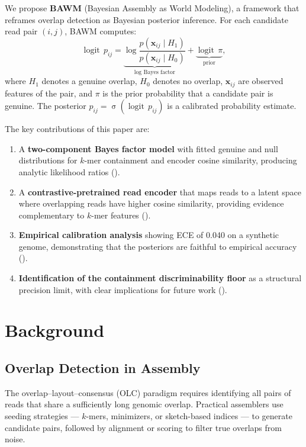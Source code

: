 \documentclass[11pt,a4paper]{article}
\newcommand{\bx}{\mathbf{x}}
\DeclareMathOperator{\logit}{logit}
\DeclareMathOperator{\sigmoid}{\sigma}
\begin{document}
We propose \textbf{BAWM} (Bayesian Assembly as World Modeling), a
framework that reframes overlap detection as Bayesian posterior
inference.  For each candidate read pair $(i,j)$, BAWM computes:
\begin{equation}
  \label{eq:posterior}
  \logit\, p_{ij}
    = \underbrace{\log \frac{p(\bx_{ij} \mid H_1)}{p(\bx_{ij} \mid H_0)}}_{\text{log Bayes factor}}
    + \underbrace{\logit\, \pi}_{\text{prior}},
\end{equation}
where $H_1$ denotes a genuine overlap, $H_0$ denotes no overlap,
$\bx_{ij}$ are observed features of the pair, and $\pi$ is the prior
probability that a candidate pair is genuine.  The posterior
$p_{ij} = \sigmoid(\logit\, p_{ij})$ is a calibrated probability
estimate.

The key contributions of this paper are:
\begin{enumerate}
  \item A \textbf{two-component Bayes factor model} with fitted
    genuine and null distributions for $k$-mer containment and encoder
    cosine similarity, producing analytic likelihood ratios
    ().
  \item A \textbf{contrastive-pretrained read encoder} that maps reads
    to a latent space where overlapping reads have higher cosine
    similarity, providing evidence complementary to $k$-mer features
    ().
  \item \textbf{Empirical calibration analysis} showing ECE of 0.040
    on a synthetic genome, demonstrating that the posteriors are
    faithful to empirical accuracy ().
  \item \textbf{Identification of the containment discriminability
    floor} as a structural precision limit, with clear implications for
    future work ().
\end{enumerate}


\section{Background}
\label{sec:background}

\subsection{Overlap Detection in Assembly}

The overlap--layout--consensus (OLC) paradigm requires identifying all
pairs of reads that share a sufficiently long genomic overlap.
Practical assemblers use seeding strategies --- $k$-mers, minimizers,
or sketch-based indices --- to generate candidate pairs, followed by
alignment or scoring to filter true overlaps from noise.
\end{document}
